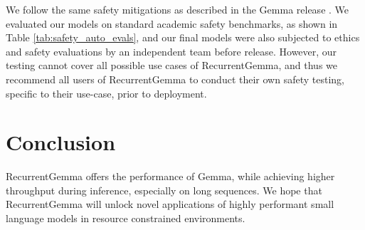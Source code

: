 \documentclass[9pt, a4paper, logo, twocolumn, copyright, nonumbering]{googledeepmind}
\begin{document}
We follow the same safety mitigations as described in the Gemma release \citep{gemma2024}. We evaluated our models on standard academic safety benchmarks, as shown in Table 
\ref{tab:safety_auto_evals}, and our final models were also subjected to ethics and safety evaluations by an independent team before release. However, our testing cannot cover all possible use cases of RecurrentGemma, and thus we recommend all users of RecurrentGemma to conduct their own safety testing, specific to their use-case, prior to deployment.

\section{Conclusion}

RecurrentGemma offers the performance of Gemma, while achieving higher throughput during inference, especially on long sequences. We hope that RecurrentGemma will unlock novel applications of highly performant small language models in resource constrained environments.


\clearpage





\end{document}
